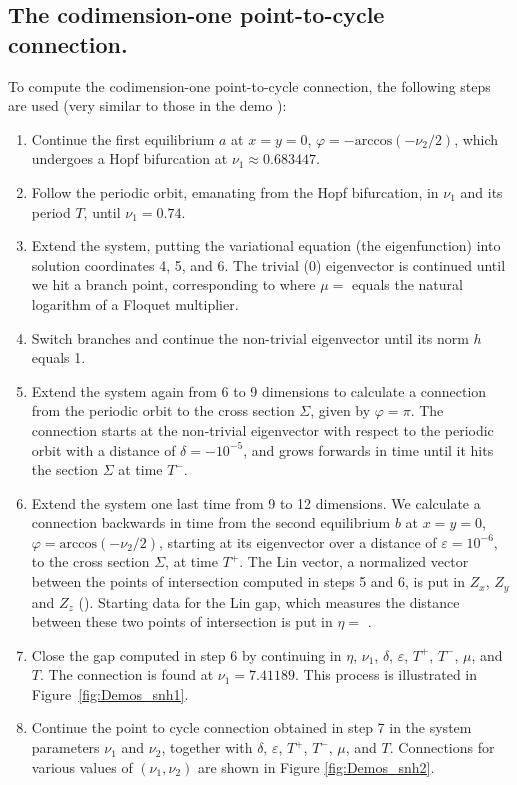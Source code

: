 \documentclass[12pt]{report}
\begin{document}
\subsection{The codimension-one point-to-cycle connection.}
To compute the codimension-one point-to-cycle connection,
the following steps are used (very similar to those in the
demo ):
\begin{enumerate}
\item
Continue the first equilibrium $a$ at $x=y=0$,
$\varphi=-\mathrm{arccos}(-\nu_2/2)$, which undergoes a Hopf bifurcation
at $\nu_1\approx 0.683447$.
\item
Follow the periodic orbit, emanating from the Hopf bifurcation, in
$\nu_1$ and its period $T$, until $\nu_1=0.74$.
\item
Extend the system, putting the variational equation (the eigenfunction)
into solution coordinates 4, 5, and 6. The trivial (0) eigenvector is
continued until we hit a branch point, corresponding to
where $\mu=$  equals the natural logarithm of a Floquet
multiplier.
\item
Switch branches and continue the non-trivial eigenvector until its
norm $h$ equals 1.
\item
Extend the system again from 6 to 9 dimensions
to calculate a connection from the periodic orbit to the cross section
$\Sigma$, given by $\varphi=\pi$.
The connection starts at the non-trivial eigenvector with respect
to the periodic orbit with a distance of $\delta=-10^{-5}$,
and grows forwards in time
until it hits the section $\Sigma$ at time $T^-$.
\item
Extend the system one last time from 9 to 12 dimensions.
We calculate a connection backwards in time
from the second equilibrium $b$ at $x=y=0$,
$\varphi=\mathrm{arccos}(-\nu_2/2)$, starting at
its eigenvector over a distance of $\varepsilon=10^{-6}$,
to the cross section $\Sigma$, at time $T^+$.
The Lin vector, a normalized vector between the points of intersection
computed in steps 5 and 6, is put in $Z_x$, $Z_y$ and $Z_z$
().
Starting data for the Lin gap, which measures the distance between
these two points of intersection is put in $\eta=$ .
\item
Close the gap computed in step 6 by continuing in 
$\eta$, $\nu_1$, $\delta$, $\varepsilon$, $T^+$, $T^-$, $\mu$, and
$T$. The connection is found at $\nu_1=7.41189$.
This process is illustrated in Figure~\ref{fig:Demos_snh1}.
\item
Continue the point to cycle connection obtained in step 7
in the system parameters $\nu_1$ and $\nu_2$, together with
$\delta$, $\varepsilon$, $T^+$, $T^-$, $\mu$, and $T$.
Connections for various
values of $(\nu_1,\nu_2)$ are shown in Figure \ref{fig:Demos_snh2}.
\end{enumerate}
\end{document}
